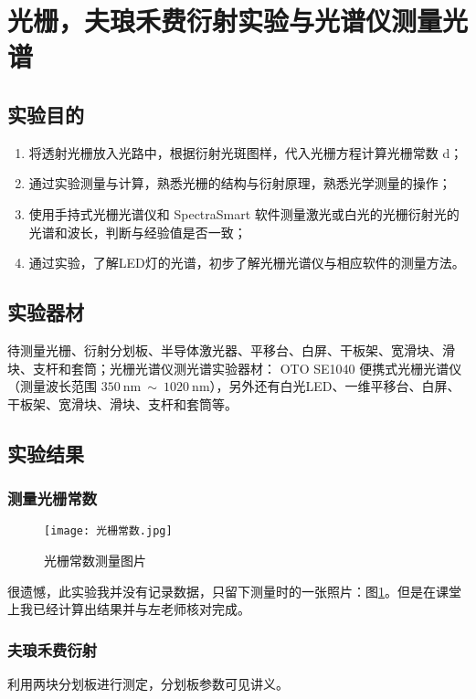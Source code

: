 \documentclass[11pt]{article}
\begin{document}
	
	\section{光栅，夫琅禾费衍射实验与光谱仪测量光谱}
	
	\subsection{实验目的}
	
	\begin{enumerate}
		\item 将透射光栅放入光路中，根据衍射光斑图样，代入光栅方程计算光栅常数 d；
		\item 通过实验测量与计算，熟悉光栅的结构与衍射原理，熟悉光学测量的操作；
		\item 使用手持式光栅光谱仪和 SpectraSmart 软件测量激光或白光的光栅衍射光的光谱和波长，判断与经验值是否一致；
		\item 通过实验，了解LED灯的光谱，初步了解光栅光谱仪与相应软件的测量方法。
	\end{enumerate}
	
	
	\subsection{实验器材}
	
	待测量光栅、衍射分划板、半导体激光器、平移台、白屏、干板架、宽滑块、滑块、支杆和套筒；光栅光谱仪测光谱实验器材： OTO SE1040 便携式光栅光谱仪（测量波长范围 $350 \ \mathrm{nm} \ \sim \ 1020 \ \mathrm{nm}$），另外还有白光LED、一维平移台、白屏、干板架、宽滑块、滑块、支杆和套筒等。
	
	\subsection{实验结果}
	
	\subsubsection{测量光栅常数}
	\begin{figure}[H]
		\centering
		\texttt{[image: 光栅常数.jpg]}
		\caption{光栅常数测量图片}
		\label{fig:光栅常数}
	\end{figure}
	很遗憾，此实验我并没有记录数据，只留下测量时的一张照片：图\ref{fig:光栅常数}。但是在课堂上我已经计算出结果并与左老师核对完成。
	
	\subsubsection{夫琅禾费衍射}
	利用两块分划板进行测定，分划板参数可见讲义。
	
\end{document}
